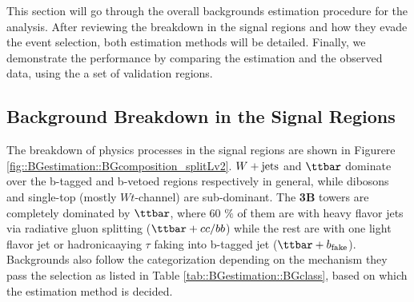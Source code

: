 This section will go through the overall backgrounds estimation procedure for the analysis. After reviewing the breakdown in the signal regions and how they evade the event selection, both estimation methods will be detailed. Finally, we demonstrate the performance by comparing the estimation and the observed data, using the a set of validation regions.


\subsection{Background Breakdown in the Signal Regions} \label{sec::BGcomposition}
The breakdown of physics processes in the signal regions are shown in Figurere \ref{fig::BGestimation::BGcomposition_splitLv2}. $W+\mathrm{jets}$ and $\ttbar$ dominate over the b-tagged and b-vetoed regions respectively in general, while dibosons and single-top (mostly $Wt$-channel) are sub-dominant. 
The \textbf{3B} towers are completely dominated by $\ttbar$, where 60 $\%$ of them are with heavy flavor jets via radiative gluon splitting ($\ttbar+cc/bb$) while the rest are with one light flavor jet or hadronicaaying $\tau$ faking into b-tagged jet ($\ttbar+b_{\mathrm{fake}}$).  \\

Backgrounds also follow the categorization depending on the mechanism they pass the selection as listed in Table \ref{tab::BGestimation::BGclass}, based on which the estimation method is decided.

